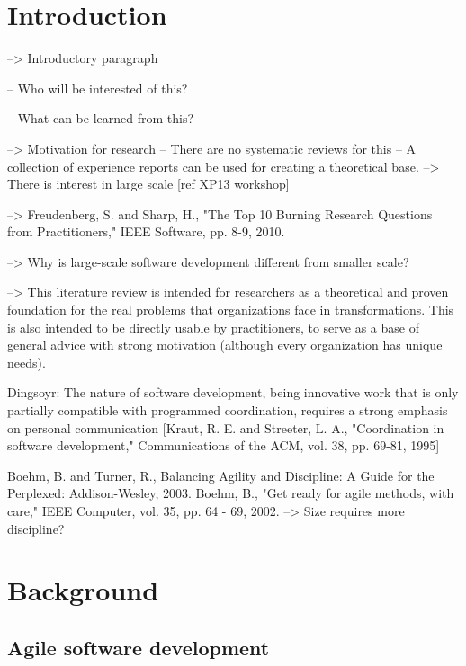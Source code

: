 
\section{Introduction}

--> Introductory paragraph

-- Who will be interested of this?

-- What can be learned from this?

--> Motivation for research
-- There are no systematic reviews for this
-- A collection of experience reports can be used for creating a theoretical
   base.
--> There is interest in large scale [ref XP13 workshop] \cite{Dingsoyr2013a}

--> Freudenberg, S. and Sharp, H., "The Top 10 Burning Research Questions from
    Practitioners," IEEE Software, pp. 8-9, 2010.

--> Why is large-scale software development different from smaller scale?

--> This literature review is intended for researchers as a theoretical
   and proven foundation for the real problems that organizations face in
   transformations.
   This is also intended to be directly usable by practitioners, to serve as a
   base of general advice with strong motivation (although every organization
   has unique needs).


Dingsoyr:
The nature of software development, being innovative work that is only partially
compatible with programmed coordination, requires a strong emphasis on personal
communication [Kraut, R. E. and Streeter, L. A., "Coordination in software
development," Communications of the ACM, vol. 38, pp. 69-81, 1995]

Boehm, B. and Turner, R., Balancing Agility and Discipline: A Guide for the
Perplexed: Addison-Wesley, 2003.
Boehm, B., "Get ready for agile methods, with care," IEEE Computer, vol. 35,
pp. 64 - 69, 2002.
--> Size requires more discipline?

\clearpage

\section{Background}
\label{sec:background}


\subsection{Agile software development}


